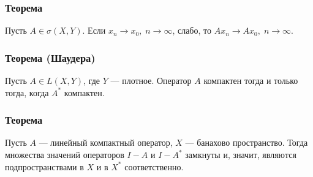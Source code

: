 \subsubsection*{Теорема}
Пусть $A \in \sigma(X, Y)$. Если $x_n \to x_0, \; n\to \infty$, слабо, то $Ax_n \to Ax_0, \; n \to \infty$.

\subsubsection*{Теорема (Шаудера)}
Пусть $A \in L(X, Y)$, где $Y$ --- плотное. Оператор $A$ компактен тогда и только тогда, когда $A^*$ компактен.

\subsubsection*{Теорема}
Пусть $A$ --- линейный компактный оператор, $X$ --- банахово пространство. Тогда множества значений операторов $I - A$ и $I - A^*$ замкнуты и, значит, являются подпространствами в $X$ и в $X^*$ соответственно.